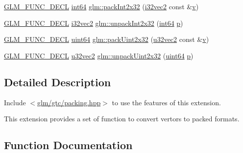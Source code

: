 \begin{DoxyCompactItemize}
\mbox{\hyperlink{setup_8hpp_ab2d052de21a70539923e9bcbf6e83a51}{G\+L\+M\+\_\+\+F\+U\+N\+C\+\_\+\+D\+E\+CL}} \mbox{\hyperlink{group__gtc__type__precision_ga435d75819cce297cc5fa21bd84ef89a5}{int64}} \mbox{\hyperlink{group__gtc__packing_ga1d6c24ff4f2b198eb2c4a2e4dcf7c336}{glm\+::pack\+Int2x32}} (\mbox{\hyperlink{group__gtc__type__precision_ga99191e0de942ecc1df32d522f8064789}{i32vec2}} const \&\mbox{\hyperlink{_s_d_l__opengl_8h_a10a82eabcb59d2fcd74acee063775f90}{v}})
\item 
\mbox{\hyperlink{setup_8hpp_ab2d052de21a70539923e9bcbf6e83a51}{G\+L\+M\+\_\+\+F\+U\+N\+C\+\_\+\+D\+E\+CL}} \mbox{\hyperlink{group__gtc__type__precision_ga99191e0de942ecc1df32d522f8064789}{i32vec2}} \mbox{\hyperlink{group__gtc__packing_ga6410b50fa48d15e70b2c34174ee4a3fc}{glm\+::unpack\+Int2x32}} (\mbox{\hyperlink{group__gtc__type__precision_ga435d75819cce297cc5fa21bd84ef89a5}{int64}} \mbox{\hyperlink{_s_d_l__opengl__glext_8h_aa5367c14d90f462230c2611b81b41d23}{p}})
\item 
\mbox{\hyperlink{setup_8hpp_ab2d052de21a70539923e9bcbf6e83a51}{G\+L\+M\+\_\+\+F\+U\+N\+C\+\_\+\+D\+E\+CL}} \mbox{\hyperlink{group__gtc__type__precision_gae3632bf9b37da66233d78930dd06378a}{uint64}} \mbox{\hyperlink{group__gtc__packing_ga4c4e4d6ab81a6b14cf066b40b6967c0a}{glm\+::pack\+Uint2x32}} (\mbox{\hyperlink{group__gtc__type__precision_gad854a1005ce84d8f6e8f05e42893f5c9}{u32vec2}} const \&\mbox{\hyperlink{_s_d_l__opengl_8h_a10a82eabcb59d2fcd74acee063775f90}{v}})
\item 
\mbox{\hyperlink{setup_8hpp_ab2d052de21a70539923e9bcbf6e83a51}{G\+L\+M\+\_\+\+F\+U\+N\+C\+\_\+\+D\+E\+CL}} \mbox{\hyperlink{group__gtc__type__precision_gad854a1005ce84d8f6e8f05e42893f5c9}{u32vec2}} \mbox{\hyperlink{group__gtc__packing_gab211ea5f8cf86f00efa4fd53cb302c82}{glm\+::unpack\+Uint2x32}} (\mbox{\hyperlink{group__gtc__type__precision_gae3632bf9b37da66233d78930dd06378a}{uint64}} \mbox{\hyperlink{_s_d_l__opengl__glext_8h_aa5367c14d90f462230c2611b81b41d23}{p}})
\end{DoxyCompactItemize}


\subsection{Detailed Description}
Include $<$\mbox{\hyperlink{gtc_2packing_8hpp}{glm/gtc/packing.\+hpp}}$>$ to use the features of this extension.

This extension provides a set of function to convert vertors to packed formats. 

\subsection{Function Documentation}
\mbox{\label{group__gtc__packing_ga8c2a0eeee677ca4dafd9e093d9e81062}} 
